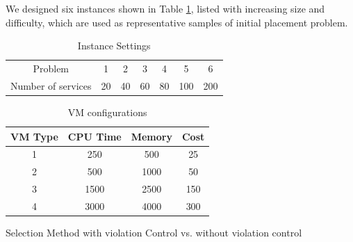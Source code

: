 We designed six instances shown in Table \ref{tab:problem}, listed with increasing size and difficulty, which are used as representative samples of initial placement problem.

\begin{table}[]
\centering
\caption{Instance Settings}
\label{tab:problem}
\begin{tabular}{ccccccc}
\hline 

Problem           & 1  & 2  & 3  & 4  & 5   & 6    \\
Number of services & 20 & 40 & 60 & 80 & 100 & 200 \\ \hline
\end{tabular}
\end{table}

\begin{table}[]
\centering
\caption{VM configurations}
\label{tab:vm}
\begin{tabular}{@{}cccc@{}}
\toprule
VM Type & CPU Time & Memory & Cost \\ \midrule
1       & 250      & 500    & 25 \\
2       & 500      & 1000   & 50 \\
3       & 1500     & 2500   & 150\\
4       & 3000     & 4000   & 300\\ \bottomrule
\end{tabular}
\end{table}
\begin{flushleft}Selection Method with violation Control vs. without violation control\end{flushleft}
